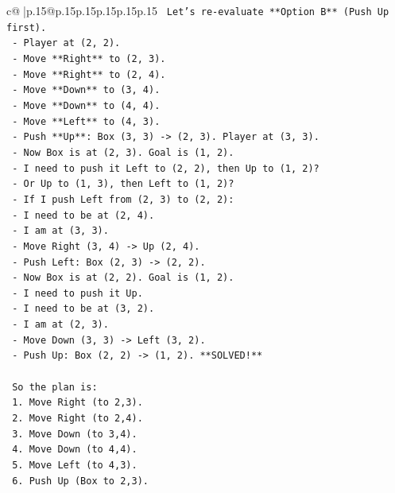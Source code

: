 \documentclass{article}
\begin{document}
{\begin{supertabular}{c@{$\;$}|p{.15\linewidth}@{}p{.15\linewidth}p{.15\linewidth}p{.15\linewidth}p{.15\linewidth}p{.15\linewidth}}
{{{\texttt{    Let's re{-}evaluate **Option B** (Push Up first).} \\
\texttt{    {-} Player at (2, 2).} \\
\texttt{    {-} Move **Right** to (2, 3).} \\
\texttt{    {-} Move **Right** to (2, 4).} \\
\texttt{    {-} Move **Down** to (3, 4).} \\
\texttt{    {-} Move **Down** to (4, 4).} \\
\texttt{    {-} Move **Left** to (4, 3).} \\
\texttt{    {-} Push **Up**: Box (3, 3) {-}> (2, 3). Player at (3, 3).} \\
\texttt{    {-} Now Box is at (2, 3). Goal is (1, 2).} \\
\texttt{    {-} I need to push it Left to (2, 2), then Up to (1, 2)?} \\
\texttt{    {-} Or Up to (1, 3), then Left to (1, 2)?} \\
\texttt{    {-} If I push Left from (2, 3) to (2, 2):} \\
\texttt{        {-} I need to be at (2, 4).} \\
\texttt{        {-} I am at (3, 3).} \\
\texttt{        {-} Move Right (3, 4) {-}> Up (2, 4).} \\
\texttt{        {-} Push Left: Box (2, 3) {-}> (2, 2).} \\
\texttt{        {-} Now Box is at (2, 2). Goal is (1, 2).} \\
\texttt{        {-} I need to push it Up.} \\
\texttt{        {-} I need to be at (3, 2).} \\
\texttt{        {-} I am at (2, 3).} \\
\texttt{        {-} Move Down (3, 3) {-}> Left (3, 2).} \\
\texttt{        {-} Push Up: Box (2, 2) {-}> (1, 2). **SOLVED!**} \\
\\ 
\texttt{    So the plan is:} \\
\texttt{    1. Move Right (to 2,3).} \\
\texttt{    2. Move Right (to 2,4).} \\
\texttt{    3. Move Down (to 3,4).} \\
\texttt{    4. Move Down (to 4,4).} \\
\texttt{    5. Move Left (to 4,3).} \\
\texttt{    6. Push Up (Box to 2,3).} \\
}}}
\end{supertabular}}
\end{document}
